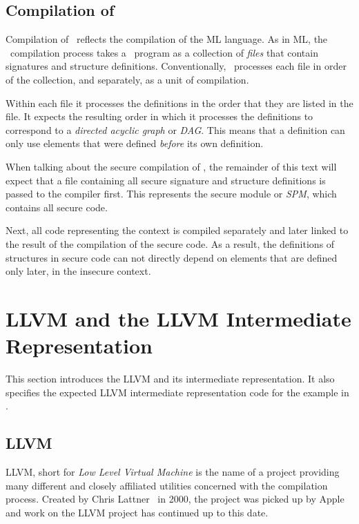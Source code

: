 \subsection{Compilation of \MiniML}
\label{sec:DefinitionOfCompilation}
Compilation of \MiniML\ reflects the compilation of the ML language.
As in ML, the \MiniML\ compilation process takes a \MiniML\ program as a collection of \emph{files} that contain signatures and structure definitions.
Conventionally, \MiniML\ processes each file in order of the collection, and separately, as a unit of compilation.

Within each file it processes the definitions in the order that they are listed in the file. It expects the resulting order in which it processes the definitions to correspond to a \emph{directed acyclic graph} or \emph{DAG}.
This means that a definition can only use elements that were defined \emph{before} its own definition.

When talking about the secure compilation of \MiniML, the remainder of this text will expect that a file containing all secure signature and structure definitions is passed to the compiler first.
This represents the secure module or \emph{SPM}, which contains all secure code.

Next, all code representing the context is compiled separately and later linked to the result of the compilation of the secure code.
As a result, the definitions of structures in secure code can not directly depend on elements that are defined only later, in the insecure context.


\section{LLVM and the LLVM Intermediate Representation}
\label{sec:LLVM}
This section introduces the LLVM and its intermediate representation.
It also specifies the expected LLVM intermediate representation code for the example in .

\subsection{LLVM}
LLVM, short for \emph{Low Level Virtual Machine} is the name of a project providing many different and closely affiliated utilities concerned with the compilation process.
Created by Chris Lattner~\cite{Lattner} in 2000, the project was picked up by Apple and work on the LLVM project has continued up to this date.

